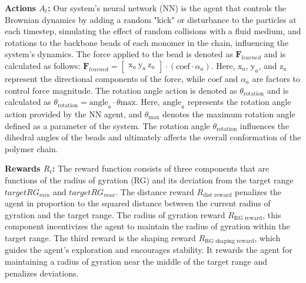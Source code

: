 \documentclass{article}
\theoremstyle{plain}
\theoremstyle{definition}
\theoremstyle{remark}
\begin{document}
\textbf{Actions $A_t$: }Our system's neural network (NN) is the agent that controls the Brownian dynamics by   adding a random "kick" or disturbance to the particles at each timestep, simulating the effect of random collisions with a fluid medium, and rotations to the backbone beads of each monomer in the chain, influencing the system's dynamics. The force applied to the bead is denoted as $\mathbf{F}_ { learned}$ and is calculated as follows:
$\mathbf{F}_{ learned} = \begin{bmatrix} \text{x}_a \ \text{y}_a \ \text{z}_a \end{bmatrix} \cdot (\text{coef} \cdot \alpha_a)$. Here, $\text{x}_a$, $\text{y}_a$, and $\text{z}_a$ represent the directional components of the force, while $\text{coef}$ and $\text{$\alpha$}_a$ are factors to control force magnitude. The rotation angle action is denoted as $\theta_{\text{rotation}}$ and is calculated as $\theta_{\text{rotation}} = \text{angle}_a \cdot \theta{\text{max}}$. Here, $\text{angle}_a$ represents the rotation angle action provided by the NN agent, and $\theta_{\text{max}}$ denotes the maximum rotation angle defined as a parameter of the system. The rotation angle $\theta_{\text{rotation}}$ influences the dihedral angles of the beads and ultimately affects the overall conformation of the polymer chain.


\textbf{Rewards $R_t$: }The reward function consists of three components that are functions of the radius of gyration (RG) and its deviation from the target range $targetRG_{min}$ and $targetRG_{max}$. The distance reward $R_{\text{dist reward}}$ penalizes the agent in proportion to the squared distance between the current radius of gyration and the target range. The radius of gyration reward $R_{\text{RG reward}}$, this component incentivizes the agent to maintain the radius of gyration within the target range. The third reward is the shaping reward $R_{\text{RG shaping reward}}$, which guides the agent's exploration and encourages stability. It rewards the agent for maintaining a radius of gyration near the middle of the target range and penalizes deviations.
\end{document}
